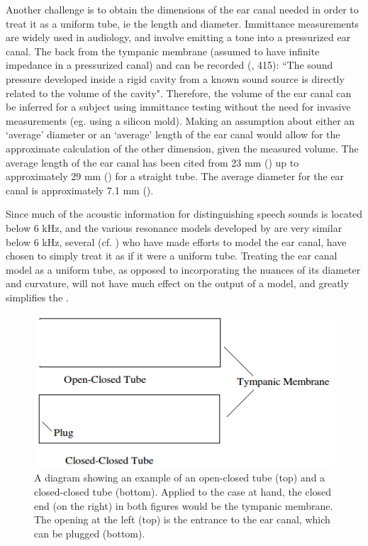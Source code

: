 Another challenge is to obtain the dimensions of the ear canal needed in order to treat it as a uniform tube, ie the length and diameter. Immittance measurements are widely used in audiology, and involve emitting a \DIFdelbegin {}\DIFdelend \DIFaddbegin {}\DIFaddend tone into a pressurized ear canal.  The \DIFdelbegin {}\DIFdelend \DIFaddbegin {}\DIFaddend back from the tympanic membrane (assumed to have infinite impedance in a pressurized canal) and can be recorded (\cite{ballachanda:97}, 415): ``The sound pressure developed inside a rigid cavity from a known sound source is directly related to the volume of the cavity".  Therefore, the volume of the ear canal can be inferred for a subject using immittance testing without the need for invasive measurements (eg. using a silicon mold).  Making an assumption about either an `average' diameter or an `average' length of the ear canal would allow for the approximate calculation of the other dimension, given the measured volume. The average length of the ear canal has been cited from 23 mm (\cite{rosen:91}) up to approximately 29 mm (\cite{stinson:89}) for a straight tube. The average diameter for the ear canal is approximately 7.1 mm (\cite{salvinelli:91}).

Since much of the acoustic information for distinguishing speech sounds is located below 6 kHz, and the various resonance models developed by \cite{stinson:89} are very similar below 6 kHz, several (cf. \cite{stinson:89,hansen:97b,stenfelt:07}) who have made efforts to model the ear canal, have chosen to simply treat it as if it were a uniform tube.  Treating the ear canal model as a uniform tube, as opposed to incorporating the nuances of its diameter and curvature, will not have much effect on the output of a model, and greatly simplifies the \DIFdelbegin {}\DIFdelend \DIFaddbegin {}\DIFaddend .

\begin{figure}[h!]
\centering
  \includegraphics{figure/open-closed-tube.png}
  \caption{A diagram showing an example of an open-closed tube (top) and a closed-closed tube (bottom).  Applied to the case at hand, the closed end (on the right) in both figures would be the tympanic membrane.  The opening at the left (top) is the entrance to the ear canal, which can be plugged (bottom).}
  \label{fig:open-closed-tube}
\end{figure}

